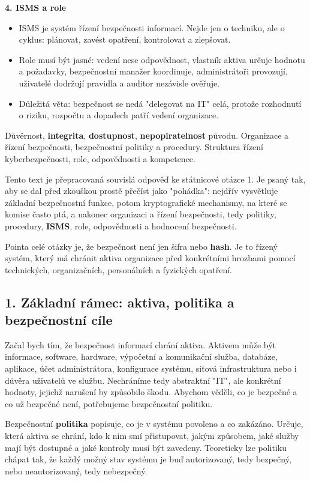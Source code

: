 \textbf{4. ISMS a role}
\begin{itemize}
  \item ISMS je systém řízení bezpečnosti informací. Nejde jen o techniku, ale o cyklus: plánovat, zavést opatření, kontrolovat a zlepšovat.
  \item Role musí být jasné: vedení nese odpovědnost, vlastník aktiva určuje hodnotu a požadavky, bezpečnostní manažer koordinuje, administrátoři provozují, uživatelé dodržují pravidla a auditor nezávisle ověřuje.
  \item Důležitá věta: bezpečnost se nedá "delegovat na IT" celá, protože rozhodnutí o riziku, rozpočtu a dopadech patří vedení organizace.
\end{itemize}

Důvěrnost, \textbf{integrita}, \textbf{dostupnost}, \textbf{nepopiratelnost} původu. Organizace a řízení bezpečnosti, bezpečnostní politiky a procedury. Struktura řízení kyberbezpečnosti, role, odpovědnosti a kompetence.

Tento text je přepracovaná souvislá odpověď ke státnicové otázce 1. Je psaný tak, aby se dal před zkouškou prostě přečíst jako "pohádka": nejdřív vysvětluje základní bezpečnostní funkce, potom kryptografické mechanismy, na které se komise často ptá, a nakonec organizaci a řízení bezpečnosti, tedy politiky, procedury, \textbf{ISMS}, role, odpovědnosti a hodnocení bezpečnosti.

Pointa celé otázky je, že bezpečnost není jen šifra nebo \textbf{hash}. Je to řízený systém, který má chránit aktiva organizace před konkrétními hrozbami pomocí technických, organizačních, personálních a fyzických opatření.

\subsection*{1. Základní rámec: aktiva, politika a bezpečnostní cíle}

Začal bych tím, že bezpečnost informací chrání aktiva. Aktivem může být informace, software, hardware, výpočetní a komunikační služba, databáze, aplikace, účet administrátora, konfigurace systému, síťová infrastruktura nebo i důvěra uživatelů ve službu. Nechráníme tedy abstraktní "IT", ale konkrétní hodnoty, jejichž narušení by způsobilo škodu. Abychom věděli, co je bezpečné a co už bezpečné není, potřebujeme bezpečnostní politiku.

Bezpečnostní \textbf{politika} popisuje, co je v systému povoleno a co zakázáno. Určuje, která aktiva se chrání, kdo k nim smí přistupovat, jakým způsobem, jaké služby mají být dostupné a jaké kontroly musí být zavedeny. Teoreticky lze politiku chápat tak, že každý možný stav systému je buď autorizovaný, tedy bezpečný, nebo neautorizovaný, tedy nebezpečný.

